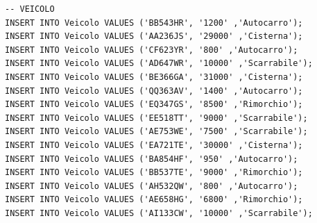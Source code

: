 \documentclass[12pt]{report}
\begin{document}
\begin{scriptsize}
\begin{verbatim}
-- VEICOLO
INSERT INTO Veicolo VALUES ('BB543HR', '1200' ,'Autocarro');
INSERT INTO Veicolo VALUES ('AA236JS', '29000' ,'Cisterna');
INSERT INTO Veicolo VALUES ('CF623YR', '800' ,'Autocarro');
INSERT INTO Veicolo VALUES ('AD647WR', '10000' ,'Scarrabile');
INSERT INTO Veicolo VALUES ('BE366GA', '31000' ,'Cisterna');
INSERT INTO Veicolo VALUES ('QQ363AV', '1400' ,'Autocarro');
INSERT INTO Veicolo VALUES ('EQ347GS', '8500' ,'Rimorchio');
INSERT INTO Veicolo VALUES ('EE518TT', '9000' ,'Scarrabile');
INSERT INTO Veicolo VALUES ('AE753WE', '7500' ,'Scarrabile');
INSERT INTO Veicolo VALUES ('EA721TE', '30000' ,'Cisterna');
INSERT INTO Veicolo VALUES ('BA854HF', '950' ,'Autocarro');
INSERT INTO Veicolo VALUES ('BB537TE', '9000' ,'Rimorchio');
INSERT INTO Veicolo VALUES ('AH532QW', '800' ,'Autocarro');
INSERT INTO Veicolo VALUES ('AE658HG', '6800' ,'Rimorchio');
INSERT INTO Veicolo VALUES ('AI133CW', '10000' ,'Scarrabile');


\end{verbatim}
\end{scriptsize}
\end{document}

